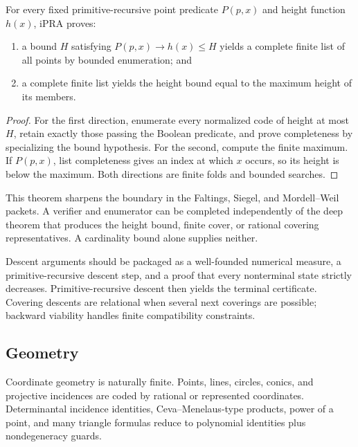 \begin{theorem}
\label{thm:height-list}
For every fixed primitive-recursive point predicate \(P(p,x)\) and height
function \(h(x)\), iPRA proves:

\begin{enumerate}
\item a bound \(H\) satisfying \(P(p,x)\to h(x)\le H\) yields a complete
      finite list of all points by bounded enumeration; and
\item a complete finite list yields the height bound equal to the maximum
      height of its members.
\end{enumerate}
\end{theorem}

\begin{proof}
For the first direction, enumerate every normalized code of height at most
\(H\), retain exactly those passing the Boolean predicate, and prove
completeness by specializing the bound hypothesis.  For the second, compute
the finite maximum.  If \(P(p,x)\), list completeness gives an index at which
\(x\) occurs, so its height is below the maximum.  Both directions are finite
folds and bounded searches.
\end{proof}

This theorem sharpens the boundary in the Faltings, Siegel, and Mordell--Weil
packets.  A verifier and enumerator can be completed independently of the
deep theorem that produces the height bound, finite cover, or rational
covering representatives.  A cardinality bound alone supplies neither.

Descent arguments should be packaged as a well-founded numerical measure,
a primitive-recursive descent step, and a proof that every nonterminal state
strictly decreases.  Primitive-recursive descent then yields the terminal
certificate.  Covering descents are relational when several next coverings
are possible; backward viability handles finite compatibility constraints.

\subsection{Geometry}

Coordinate geometry is naturally finite.  Points, lines, circles, conics, and
projective incidences are coded by rational or represented coordinates.
Determinantal incidence identities, Ceva--Menelaus-type products, power of a
point, and many triangle formulas reduce to polynomial identities plus
nondegeneracy guards.

